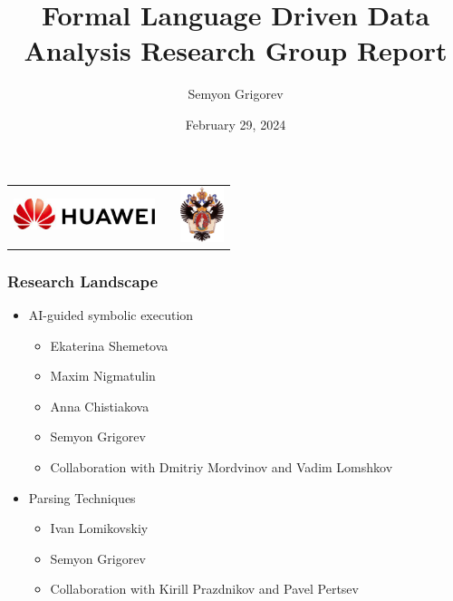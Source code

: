 \documentclass[xcolor=table,aspectratio=169]{beamer}
\title[FLDDA Research Group Report]{Formal Language Driven Data Analysis Research Group Report}
\institute[SPbSU]{
Saint Petersburg State University
}
\author[Semyon Grigorev]{Semyon Grigorev}
\date{February 29, 2024}
\begin{document}
{
\begin{frame}[fragile]
  \begin{table}
  \centering
  \begin{tabularx}{\linewidth}{XcX}
    \includegraphics[height=0.9cm]{pictures/hu_logo.jpeg} \hfill
    & 
    & \hfill \includegraphics[height=1.6cm]{pictures/SPbGU_Logo.png}
  \end{tabularx}
  \end{table}
  \titlepage
\end{frame}
}

\begin{frame}[fragile]
  \frametitle{Research Landscape}  
  \begin{itemize}
    \item AI-guided symbolic execution
    \begin{itemize}
      \item Ekaterina Shemetova
      \item Maxim Nigmatulin
      \item Anna Chistiakova
      \item Semyon Grigorev
      \item Collaboration with Dmitriy Mordvinov and Vadim Lomshkov
    \end{itemize} 
    \item Parsing Techniques
    \begin{itemize}
      \item Ivan Lomikovskiy
      \item Semyon Grigorev
      \item Collaboration with Kirill Prazdnikov and Pavel Pertsev
    \end{itemize}
  \end{itemize} 
  
\end{frame}
\end{document}
